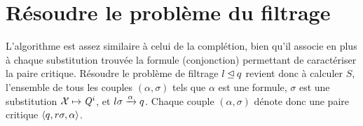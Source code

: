 







\section{Résoudre le problème du filtrage}
\label{sec:filtrage}

L'algorithme est assez similaire à celui de la complétion, bien qu'il associe en plus à chaque substitution trouvée
la formule (conjonction) permettant de caractériser la paire critique. Résoudre le problème de filtrage $l \unlhd q$ revient donc à 
calculer $S$, l'ensemble de tous les couples $(\alpha, \sigma)$ 
tels que $\alpha$ est une formule, $\sigma$ est une substitution $\mathcal X \mapsto \mathit Q^i$, et $l\sigma \xrightarrow{\alpha} q$.
Chaque couple $(\alpha, \sigma)$ dénote donc une paire critique $\langle q,r\sigma,\alpha\rangle$.


